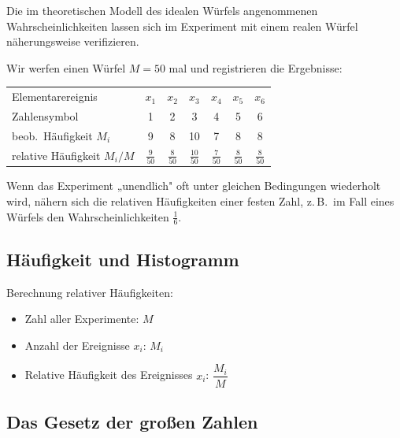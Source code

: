 Die im theoretischen Modell des idealen Würfels angenommenen Wahrscheinlichkeiten lassen sich im Experiment mit einem realen Würfel näherungsweise verifizieren.

\begin{beispiel}[Würfelwurf mit $M = 50$]
Wir werfen einen Würfel $M = 50$ mal und registrieren die Ergebnisse:

\begin{center}
\begin{tabular}{lcccccc}
  \hline
  Elementarereignis              & $x_1$ & $x_2$ & $x_3$ & $x_4$ & $x_5$ & $x_6$ \\
  Zahlensymbol                   & 1 & 2 & 3 & 4 & 5 & 6 \\
  beob.\ Häufigkeit $M_i$        & 9 & 8 & 10 & 7 & 8 & 8 \\
  relative Häufigkeit $M_i/M$    & $\frac{9}{50}$ & $\frac{8}{50}$ & $\frac{10}{50}$ & $\frac{7}{50}$ & $\frac{8}{50}$ & $\frac{8}{50}$ \\
  \hline
\end{tabular}
\end{center}
\end{beispiel}

Wenn das Experiment „unendlich" oft unter gleichen Bedingungen wiederholt wird, nähern sich die relativen Häufigkeiten einer festen Zahl, z.\,B.\ im Fall eines Würfels den Wahrscheinlichkeiten $\frac{1}{6}$.

\subsection{Häufigkeit und Histogramm}
\label{sec:histogramm}

Berechnung relativer Häufigkeiten:

\begin{itemize}
  \item Zahl aller Experimente: $M$
  \item Anzahl der Ereignisse $x_i$: $M_i$
  \item Relative Häufigkeit des Ereignisses $x_i$: $\dfrac{M_i}{M}$
\end{itemize}


\subsection{Das Gesetz der großen Zahlen}
\label{sec:gesetz-grosse-zahlen}

